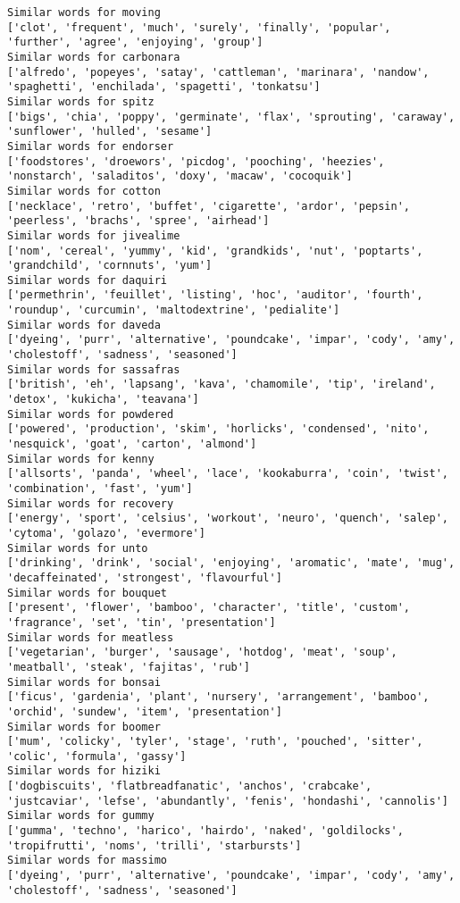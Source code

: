 \documentclass[11pt]{article}
\begin{document}
\begin{Verbatim}[commandchars=\\\{\}]
Similar words for moving
['clot', 'frequent', 'much', 'surely', 'finally', 'popular', 'further', 'agree', 'enjoying', 'group']
Similar words for carbonara
['alfredo', 'popeyes', 'satay', 'cattleman', 'marinara', 'nandow', 'spaghetti', 'enchilada', 'spagetti', 'tonkatsu']
Similar words for spitz
['bigs', 'chia', 'poppy', 'germinate', 'flax', 'sprouting', 'caraway', 'sunflower', 'hulled', 'sesame']
Similar words for endorser
['foodstores', 'droewors', 'picdog', 'pooching', 'heezies', 'nonstarch', 'saladitos', 'doxy', 'macaw', 'cocoquik']
Similar words for cotton
['necklace', 'retro', 'buffet', 'cigarette', 'ardor', 'pepsin', 'peerless', 'brachs', 'spree', 'airhead']
Similar words for jivealime
['nom', 'cereal', 'yummy', 'kid', 'grandkids', 'nut', 'poptarts', 'grandchild', 'cornnuts', 'yum']
Similar words for daquiri
['permethrin', 'feuillet', 'listing', 'hoc', 'auditor', 'fourth', 'roundup', 'curcumin', 'maltodextrine', 'pedialite']
Similar words for daveda
['dyeing', 'purr', 'alternative', 'poundcake', 'impar', 'cody', 'amy', 'cholestoff', 'sadness', 'seasoned']
Similar words for sassafras
['british', 'eh', 'lapsang', 'kava', 'chamomile', 'tip', 'ireland', 'detox', 'kukicha', 'teavana']
Similar words for powdered
['powered', 'production', 'skim', 'horlicks', 'condensed', 'nito', 'nesquick', 'goat', 'carton', 'almond']
Similar words for kenny
['allsorts', 'panda', 'wheel', 'lace', 'kookaburra', 'coin', 'twist', 'combination', 'fast', 'yum']
Similar words for recovery
['energy', 'sport', 'celsius', 'workout', 'neuro', 'quench', 'salep', 'cytoma', 'golazo', 'evermore']
Similar words for unto
['drinking', 'drink', 'social', 'enjoying', 'aromatic', 'mate', 'mug', 'decaffeinated', 'strongest', 'flavourful']
Similar words for bouquet
['present', 'flower', 'bamboo', 'character', 'title', 'custom', 'fragrance', 'set', 'tin', 'presentation']
Similar words for meatless
['vegetarian', 'burger', 'sausage', 'hotdog', 'meat', 'soup', 'meatball', 'steak', 'fajitas', 'rub']
Similar words for bonsai
['ficus', 'gardenia', 'plant', 'nursery', 'arrangement', 'bamboo', 'orchid', 'sundew', 'item', 'presentation']
Similar words for boomer
['mum', 'colicky', 'tyler', 'stage', 'ruth', 'pouched', 'sitter', 'colic', 'formula', 'gassy']
Similar words for hiziki
['dogbiscuits', 'flatbreadfanatic', 'anchos', 'crabcake', 'justcaviar', 'lefse', 'abundantly', 'fenis', 'hondashi', 'cannolis']
Similar words for gummy
['gumma', 'techno', 'harico', 'hairdo', 'naked', 'goldilocks', 'tropifrutti', 'noms', 'trilli', 'starbursts']
Similar words for massimo
['dyeing', 'purr', 'alternative', 'poundcake', 'impar', 'cody', 'amy', 'cholestoff', 'sadness', 'seasoned']

\end{Verbatim}
\end{document}
